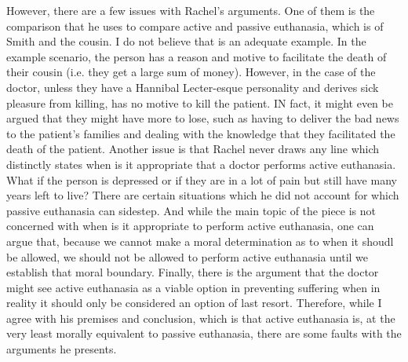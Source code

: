 \documentclass{article}
\begin{document}
However, there are a few issues with Rachel's arguments. One of them is the comparison that he uses to 
compare active and passive euthanasia, which is of Smith and the cousin. I do not believe that is an adequate
example. In the example scenario, the person has a reason and motive to facilitate the death of their
cousin (i.e. they get a large sum of money). However, in the case of the doctor, unless they have
a Hannibal Lecter-esque personality and derives sick pleasure from killing, has no motive to kill the patient.
IN fact, it might even be argued that they might have more to lose, such as having to deliver the bad news
to the patient's families and dealing with the knowledge that they facilitated the death of the patient.
Another issue is that Rachel never draws any line which distinctly states when is it appropriate that a doctor
performs active euthanasia. What if the person is depressed or if they are in a lot of pain but still have
many years left to live? There are certain situations which he did not account for which
passive euthanasia can sidestep. And while the main topic of the piece is not concerned with when is it
appropriate to perform active euthanasia, one can argue that, because we cannot make a moral determination
as to when it shoudl be allowed, we should not be allowed to perform active euthanasia until we establish that
moral boundary. Finally, there is the argument that the doctor might see active euthanasia as a viable option in
preventing suffering when in reality it should only be considered an option of last resort. Therefore, while
I agree with his premises and conclusion, which is that active euthanasia is, at the very least morally
equivalent to passive euthanasia, there are some faults with the arguments he presents.
\end{document}
